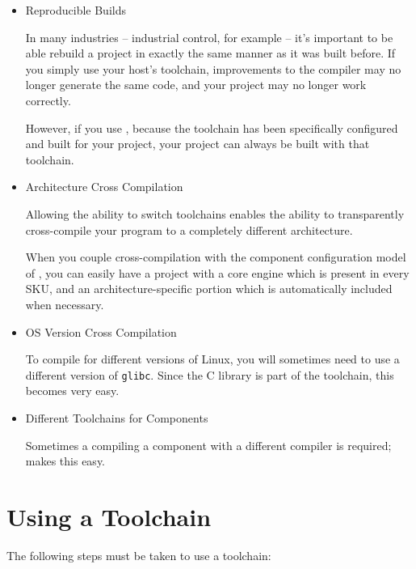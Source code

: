 \begin{itemize}
\item Reproducible Builds

  In many industries -- industrial control, for example -- it's
  important to be able rebuild a project in exactly the same manner
  as it was built before.  If you simply use your host's toolchain,
  improvements to the compiler may no longer generate the same code,
  and your project may no longer work correctly.

  However, if you use \lmsbw, because the toolchain has been
  specifically configured and built for your project, your project can
  always be built with that toolchain.

\item Architecture Cross Compilation

  Allowing the ability to switch toolchains enables the ability to
  transparently cross-compile your program to a completely different
  architecture.

  When you couple cross-compilation with the component configuration
  model of \lmsbw, you can easily have a project with a core engine
  which is present in every SKU, and an architecture-specific portion
  which is automatically included when necessary.

\item OS Version Cross Compilation

  To compile for different versions of Linux, you will sometimes need
  to use a different version of \texttt{glibc}.  Since the C library
  is part of the toolchain, this becomes very easy.

\item Different Toolchains for Components

  Sometimes a compiling a component with a different compiler is
  required; \lmsbw makes this easy.
\end{itemize}

\section{Using a Toolchain}

The following steps must be taken to use a toolchain:

